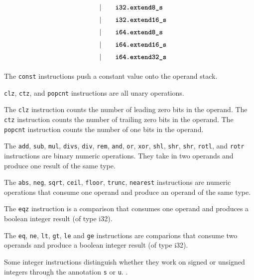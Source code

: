 \begin{alignat*}{9}
    &&       &&\quad | &\quad && \textbf{\texttt{i32.extend8\textunderscore s}} \quad &&  \\[1mm]
    &&       &&\quad | &\quad && \textbf{\texttt{i32.extend16\textunderscore s}} \quad &&  \\[1mm]
    &&       &&\quad | &\quad && \textbf{\texttt{i64.extend8\textunderscore s}} \quad &&  \\[1mm]
    &&       &&\quad | &\quad && \textbf{\texttt{i64.extend16\textunderscore s}} \quad &&  \\[1mm]
    &&       &&\quad | &\quad && \textbf{\texttt{i64.extend32\textunderscore s}} \quad &&  \\[1mm]
\end{alignat*}


The \texttt{const} instructions push a constant value onto the operand stack. \vspace{1em}

\texttt{clz}, \texttt{ctz}, and \texttt{popcnt} instructions are all unary operations. \vspace{1em}

The \texttt{clz} instruction counts the number of leading zero bits in the operand.
The \texttt{ctz} instruction counts the number of trailing zero bits in the operand.
The \texttt{popcnt} instruction counts the number of one bits in the operand. \vspace{1em}

The \texttt{add}, \texttt{sub}, \texttt{mul}, \texttt{div\textunderscore s}, \texttt{div}, \texttt{rem}, \texttt{and}, \texttt{or}, \texttt{xor}, \texttt{shl}, \texttt{shr}, \texttt{shr}, \texttt{rotl}, and \texttt{rotr} instructions are binary numeric operations. They take in two operands and produce one result of the same type.\vspace{1em}

The \texttt{abs}, \texttt{neg}, \texttt{sqrt}, \texttt{ceil}, \texttt{floor}, \texttt{trunc}, \texttt{nearest} instructions are numeric operations that consume one operand and produce an operand of the same type.

The \texttt{eqz} instruction is a comparison that consumes one operand and produces a boolean integer result (of type i32). \vspace{1em}

The \texttt{eq}, \texttt{ne}, \texttt{lt}, \texttt{gt}, \texttt{le} and \texttt{ge} instructions are comparions that consume two operands and produce a boolean integer result (of type i32). \vspace{1em}

Some integer instructions distinguish whether they work on signed or unsigned integers through the annotation \texttt{\textunderscore s} or \texttt{\textunderscore u}. \vspace{1em}. \vspace{1em}